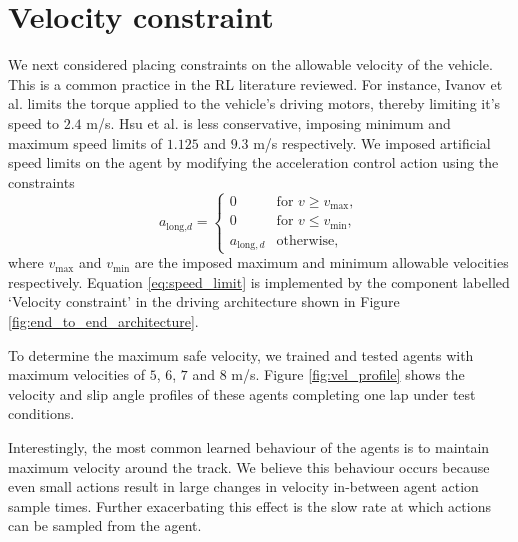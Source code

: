 \section{Velocity constraint} \label{sec:velocity_constraint}
We next considered placing constraints on the allowable velocity of the vehicle.
This is a common practice in the RL literature reviewed. 
For instance, Ivanov et al. \cite{Ivanov2020} limits the torque applied to the vehicle's driving motors, thereby limiting it's speed to $2.4$ m/s. Hsu et al. \cite{hsu2022} is less conservative, imposing minimum and maximum speed limits of $1.125$ and $9.3$ m/s respectively.
We imposed artificial speed limits on the agent by modifying the acceleration control action using the constraints 
\begin{equation}
    a_{\text{long,}d} = 
    \begin{cases}
    0                   &   \text{for } v \geq v_{\text{max}}, \\
    0                   &   \text{for } v \leq v_{\text{min}}, \\
    a_{\text{long},d}   &   \text{otherwise},
    \end{cases}
\label{eq:speed_limit}
\end{equation}
where $v_{\text{max}}$ and $v_{\text{min}}$ are the imposed maximum and minimum allowable velocities respectively.
Equation \ref{eq:speed_limit} is implemented by the component labelled `Velocity constraint' in the driving architecture shown in Figure \ref{fig:end_to_end_architecture}.

To determine the maximum safe velocity, we trained and tested agents with maximum velocities of $5$, $6$, $7$ and $8$ m/s.
Figure \ref{fig:vel_profile} shows the velocity and slip angle profiles of these agents completing one lap under test conditions.

Interestingly, the most common learned behaviour of the agents is to maintain maximum velocity around the track.
We believe this behaviour occurs because even small actions result in large changes in velocity in-between agent action sample times.
Further exacerbating this effect  is the slow rate at which actions can be sampled from the agent.



